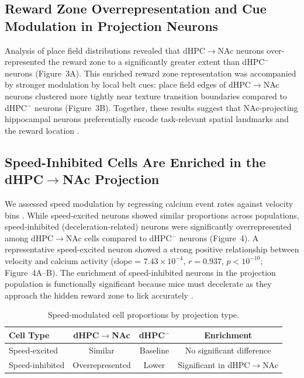 \documentclass[11pt]{article}
\begin{document}
\subsection{Reward Zone Overrepresentation and Cue Modulation in Projection Neurons}

Analysis of place field distributions revealed that dHPC$\to$NAc neurons over-represented the reward zone to a significantly greater extent than dHPC$^-$ neurons (Figure~3A). This enriched reward zone representation was accompanied by stronger modulation by local belt cues: place field edges of dHPC$\to$NAc neurons clustered more tightly near texture transition boundaries compared to dHPC$^-$ neurons (Figure~3B). Together, these results suggest that NAc-projecting hippocampal neurons preferentially encode task-relevant spatial landmarks and the reward location \citep{Dupret2010,Zaremba2017}.

\subsection{Speed-Inhibited Cells Are Enriched in the dHPC$\to$NAc Projection}

We assessed speed modulation by regressing calcium event rates against velocity bins \citep{Kropff2015,Hinman2016}. While speed-excited neurons showed similar proportions across populations, speed-inhibited (deceleration-related) neurons were significantly overrepresented among dHPC$\to$NAc cells compared to dHPC$^-$ neurons (Figure~4). A representative speed-excited neuron showed a strong positive relationship between velocity and calcium activity (slope = $7.43 \times 10^{-4}$, $r = 0.937$, $p < 10^{-10}$; Figure~4A--B). The enrichment of speed-inhibited neurons in the projection population is functionally significant because mice must decelerate as they approach the hidden reward zone to lick accurately \citep{Sargolini2006,Kropff2015}.

\begin{table}[H]
\centering
\caption{Speed-modulated cell proportions by projection type.}
\label{tab:speed}
\begin{tabular}{lccc}
\toprule
Cell Type & dHPC$\to$NAc & dHPC$^-$ & Enrichment \\
\midrule
Speed-excited & Similar & Baseline & No significant difference \\
Speed-inhibited & Overrepresented & Lower & Significant in dHPC$\to$NAc \\
\bottomrule
\end{tabular}
\end{table}
\end{document}
